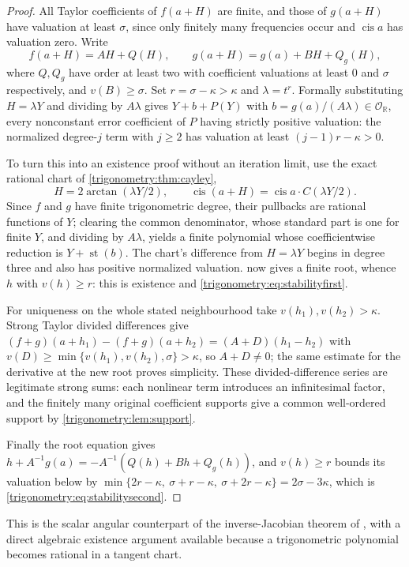 \documentclass[11pt,letterpaper]{article}
\numberwithin{equation}{section}
\theoremstyle{definition}
\theoremstyle{remark}
\newcommand{\R}{\mathbb R}
\newcommand{\OO}{\mathcal O}
\newcommand{\st}{\operatorname{st}}
\newcommand{\cis}{\operatorname{cis}}
\begin{document}
\begin{proof}
All Taylor coefficients of $f(a+H)$ are finite, and those of $g(a+H)$ have valuation at least
$\sigma$, since only finitely many frequencies occur and $\cis a$ has valuation zero. Write
\[
 f(a+H)=AH+Q(H),\qquad g(a+H)=g(a)+BH+Q_g(H),
\]
where $Q,Q_g$ have order at least two with coefficient valuations at least $0$ and $\sigma$
respectively, and $v(B)\ge\sigma$. Set $r=\sigma-\kappa>\kappa$ and $\lambda=t^r$. Formally
substituting $H=\lambda Y$ and dividing by $A\lambda$ gives $Y+b+P(Y)$ with
$b=g(a)/(A\lambda)\in\OO_{\R}$, every nonconstant error coefficient of $P$ having strictly positive
valuation: the normalized degree-$j$ term with $j\ge2$ has valuation at least $(j-1)r-\kappa>0$.

To turn this into an existence proof without an iteration limit, use the exact rational chart of
\cref{trigonometry:thm:cayley},
\[
 H=2\arctan(\lambda Y/2),\qquad \cis(a+H)=\cis a\cdot C(\lambda Y/2).
\]
Since $f$ and $g$ have finite trigonometric degree, their pullbacks are rational functions of $Y$;
clearing the common denominator, whose standard part is one for finite $Y$, and dividing by
$A\lambda$, yields a finite polynomial whose coefficientwise reduction is $Y+\st(b)$. The chart's
difference from $H=\lambda Y$ begins in degree three and also has positive normalized valuation.
 now gives a finite root, whence $h$ with $v(h)\ge r$: this is
existence and \cref{trigonometry:eq:stabilityfirst}.

For uniqueness on the whole stated neighbourhood take $v(h_1),v(h_2)>\kappa$. Strong Taylor divided
differences give $(f+g)(a+h_1)-(f+g)(a+h_2)=(A+D)(h_1-h_2)$ with
$v(D)\ge\min\{v(h_1),v(h_2),\sigma\}>\kappa$, so $A+D\ne0$; the same estimate for the derivative at
the new root proves simplicity. These divided-difference series are legitimate strong sums: each
nonlinear term introduces an infinitesimal factor, and the finitely many original coefficient
supports give a common well-ordered support by \cref{trigonometry:lem:support}.

Finally the root equation gives $h+A^{-1}g(a)=-A^{-1}(Q(h)+Bh+Q_g(h))$, and $v(h)\ge r$ bounds its
valuation below by $\min\{2r-\kappa,\ \sigma+r-\kappa,\ \sigma+2r-\kappa\}=2\sigma-3\kappa$, which
is \cref{trigonometry:eq:stabilitysecond}.
\end{proof}
This is the scalar angular counterpart of the inverse-Jacobian theorem of
\cite[\S9]{SourceIntersections}, with a direct algebraic existence argument available because a
trigonometric polynomial becomes rational in a tangent chart.
\end{document}

